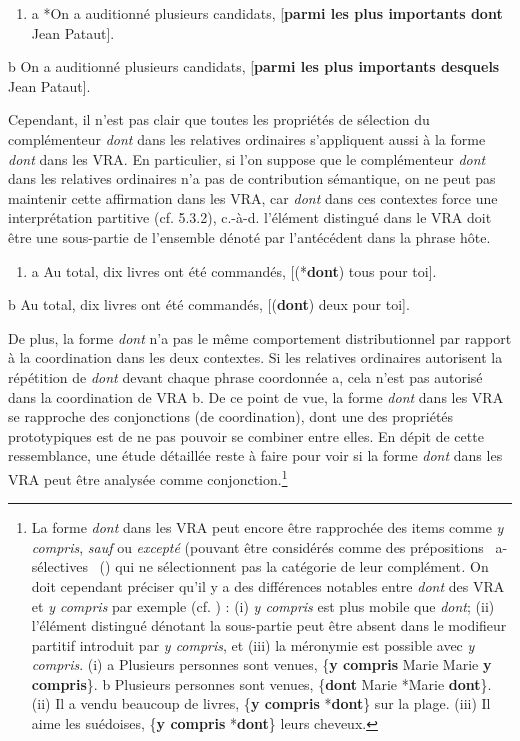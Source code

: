 \begin{enumerate}
\item \label{bkm:Ref292878562}a  *On a auditionné plusieurs candidats, [\textbf{parmi les plus importants dont} Jean Pataut].


\end{enumerate}
  b  On a auditionné plusieurs candidats, [\textbf{parmi les plus importants desquels} Jean Pataut].

Cependant, il n'est pas clair que toutes les propriétés de sélection du complémenteur \textit{dont} dans les relatives ordinaires  s'appliquent aussi à la forme \textit{dont} dans les VRA. En particulier, si l'on suppose que le complémenteur \textit{dont} dans les relatives ordinaires n'a pas de contribution sémantique, on ne peut pas maintenir cette affirmation dans les VRA, car \textit{dont} dans ces contextes force une interprétation partitive (cf. 5.3.2), c.-à-d. l'élément distingué dans le VRA doit être une sous-partie de l'ensemble dénoté par l'antécédent dans la phrase hôte.  


\begin{enumerate}
\item a  Au total, dix livres ont été commandés, [(*\textbf{dont}) tous pour toi].


\end{enumerate}
  b  Au total, dix livres ont été commandés, [(\textbf{dont}) deux pour toi].

De plus, la forme \textit{dont} n'a pas le même comportement distributionnel par rapport à la coordination dans les deux contextes. Si les relatives ordinaires autorisent la répétition de \textit{dont} devant chaque phrase coordonnée a, cela n'est pas autorisé dans la coordination de VRA b. De ce point de vue, la forme \textit{dont} dans les VRA se rapproche des conjonctions (de coordination), dont une des propriétés prototypiques est de ne pas pouvoir se combiner entre elles. En dépit de cette ressemblance, une étude détaillée reste à faire pour voir si la forme \textit{dont} dans les VRA peut être analysée comme conjonction.\footnote{La forme \textit{dont} dans les VRA peut encore être rapprochée des items comme \textit{y compris}, \textit{sauf} ou \textit{excepté} (pouvant être considérés comme des prépositions~{\guillemotleft} a-sélectives~{\guillemotright} (\citet{Melis2001}) qui ne sélectionnent pas la catégorie de leur complément\textit{.} On doit cependant préciser qu'il y a des différences notables entre \textit{dont} des VRA et \textit{y compris} par exemple (cf. \citet{Laurens2007}) : (i) \textit{y compris} est plus mobile que \textit{dont}; (ii) l'élément distingué dénotant la sous-partie peut être absent dans le modifieur partitif introduit par \textit{y compris}, et (iii)  la méronymie est possible avec \textit{y compris}. 
(i)  a  Plusieurs personnes sont venues, \{\textbf{y compris} Marie {\textbar} Marie \textbf{y compris}\}.
  b  Plusieurs personnes sont venues, \{\textbf{dont} Marie {\textbar} *Marie \textbf{dont}\}.
(ii)  Il a vendu beaucoup de livres, \{\textbf{y compris} {\textbar} *\textbf{dont}\} sur la plage.
(iii)  Il aime les suédoises, \{\textbf{y compris} {\textbar} *\textbf{dont}\} leurs cheveux.} 


